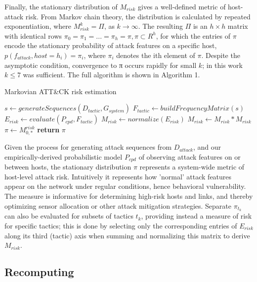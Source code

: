 \documentclass[journal]{IEEEtran}
\begin{document}
Finally, the stationary distribution of $M_{risk}$ gives a well-defined metric of host-attack risk. From Markov chain theory, the distribution is calculated by repeated exponentiation, where $M_{risk}^{k} = \Pi$, as $k \rightarrow \infty$. The resulting $\Pi$ is an $h \times h$ matrix with identical rows ${\pi_{0}=\pi_{1}=...=\pi_{h}=\pi},\pi \subset R^{h}$, for which the entries of $\pi$ encode the stationary probability of attack features on a specific host, $p(f_{attack},host=h_{i}) = \pi_{i}$, where $\pi_{i}$ denotes the ith element of $\pi$. Despite the asymptotic condition, convergence to π occurs rapidly for small $k$; in this work $k \leq 7$ was sufficient. The full algorithm is shown in Algorithm 1.

\begin{algorithm}
\caption{Markovian ATT\&CK risk estimation}\label{alg:tomato}
\begin{algorithmic}[1]
\State $s \gets generateSequences(D_{tactic}, G_{system})$
\State $F_{tactic} \gets buildFrequencyMatrix(s)$
\State $E_{risk} \gets evaluate(P_{cpd}, F_{tactic})$
\State $M_{risk} \gets normalize(E_{risk})$
\State $M_{risk} \gets M_{risk} * M_{risk}$
\EndWhile\label{endwhile}
\State $\pi \gets M^{risk}_{0,*}$ 
\State \textbf{return} $\pi$
\EndProcedure
\end{algorithmic}
\end{algorithm}

Given the process for generating attack sequences from $D_{attack}$, and our empirically-derived probabilistic model $P_{cpd}$ of observing attack features on or between hosts, the stationary distribution $\pi$ represents a system-wide metric of host-level attack risk. Intuitively it represents how 'normal' attack features appear on the network under regular conditions, hence behavioral vulnerability. The measure is informative for determining high-risk hosts and links, and thereby optimizing sensor allocation or other attack mitigation strategies. Separate $\pi_{t_{k}}$ can also be evaluated for subsets of tactics $t_{k}$, providing instead a measure of risk for specific tactics; this is done by selecting only the corresponding entries of $E_{risk}$ along its third (tactic) axis when summing and normalizing this matrix to derive $M_{risk}$.

\color{black}



\subsection{Recomputing}
\end{document}
